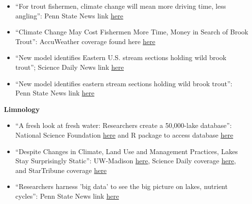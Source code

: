 \documentclass[10pt]{article}
\begin{document}
\begin{flushleft}
\begin{itemize}
\item ``For trout fishermen, climate change will mean more driving time, less angling'': Penn State News link
\href{http://news.psu.edu/story/366131/2015/08/20/research/trout-fishermen-climate-change-will-mean-more-driving-time-less}{here}
\item ``Climate Change May Cost Fishermen More Time, Money in Search of Brook Trout'': AccuWeather coverage found here \href{http://www.accuweather.com/en/weather-news/climate-change-brook-trout-fisherman-high-cost/52151933}{here}\\

\item ``New model identifies Eastern U.S. stream sections holding wild brook trout''; Science Daily News link \href{http://www.sciencedaily.com/releases/2015/01/150106154610.htm}{here}\\
\item ``New model identifies eastern stream sections holding wild brook trout'': Penn State News link
\href{http://news.psu.edu/story/339640/2015/01/06/research/new-model-identifies-eastern-stream-sections-holding-wild-brook}{here}\\
\vspace{5pt}
\end{itemize}
\textbf{Limnology}\\
\begin{itemize}
\item ``A fresh look at fresh water: Researchers create a 50,000-lake database'': National Science Foundation \href{https://www.nsf.gov/news/news_summ.jsp?cntn_id=243391&org=NSF&from=news}{here} and R package to access database \href{https://github.com/cont-limno/LAGOSNE}{here} 
\item ``Despite Changes in Climate, Land Use and Management Practices, Lakes Stay Surprisingly Static'': UW-Madison  \href{http://blog.limnology.wisc.edu/despite-changes-in-climate-land-use-and-management-practices-lakes-stay-surprisingly-static/}{here}, Science Daily coverage  \href{https://www.sciencedaily.com/releases/2017/08/170823184403.htm}{here}, and StarTribune coverage \href{http://m.startribune.com/minnesota-lakes-holding-their-own-against-pollution/441820303/?section=local}{here}
\item ``Researchers harness 'big data' to see the big picture on lakes, nutrient cycles'': Penn State News link \href{http://news.psu.edu/story/425689/2016/09/13/research/researchers-harness-big-data-see-big-picture-lakes-nutrient-cycles}{here}\\

\end{itemize}
\end{flushleft}
\end{document}
